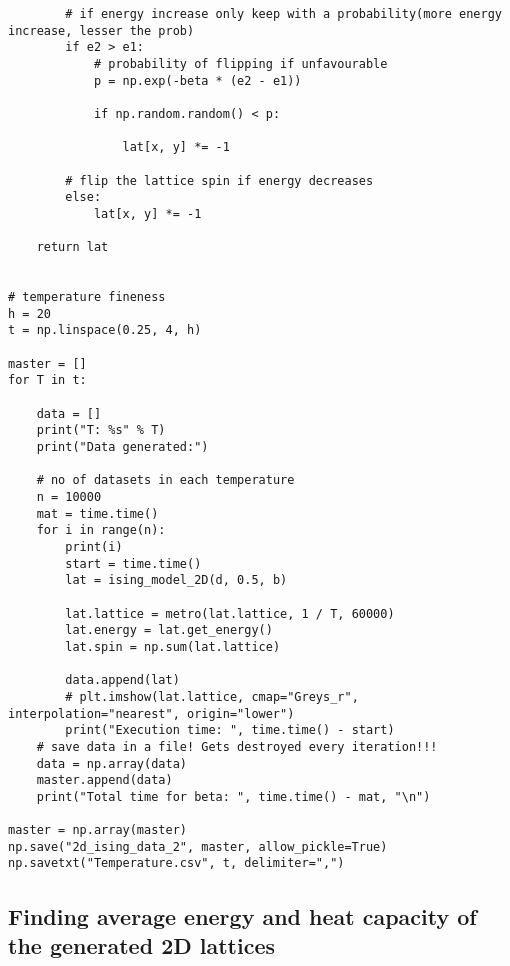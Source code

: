 \begin{verbatim}
        # if energy increase only keep with a probability(more energy increase, lesser the prob)
        if e2 > e1:
            # probability of flipping if unfavourable
            p = np.exp(-beta * (e2 - e1))

            if np.random.random() < p:

                lat[x, y] *= -1

        # flip the lattice spin if energy decreases
        else:
            lat[x, y] *= -1

    return lat


# temperature fineness
h = 20
t = np.linspace(0.25, 4, h)

master = []
for T in t:

    data = []
    print("T: %s" % T)
    print("Data generated:")

    # no of datasets in each temperature
    n = 10000
    mat = time.time()
    for i in range(n):
        print(i)
        start = time.time()
        lat = ising_model_2D(d, 0.5, b)

        lat.lattice = metro(lat.lattice, 1 / T, 60000)
        lat.energy = lat.get_energy()
        lat.spin = np.sum(lat.lattice)

        data.append(lat)
        # plt.imshow(lat.lattice, cmap="Greys_r", interpolation="nearest", origin="lower")
        print("Execution time: ", time.time() - start)
    # save data in a file! Gets destroyed every iteration!!!
    data = np.array(data)
    master.append(data)
    print("Total time for beta: ", time.time() - mat, "\n")

master = np.array(master)
np.save("2d_ising_data_2", master, allow_pickle=True)
np.savetxt("Temperature.csv", t, delimiter=",")
\end{verbatim}

\subsection{Finding average energy and heat capacity of the generated 2D lattices}

